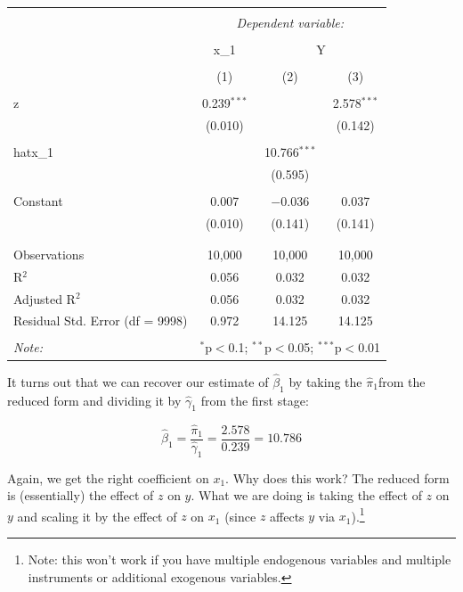 \documentclass[
]{article}
\begin{document}
\begin{table}[!htbp] \centering 
  \caption{} 
  \label{} 
\begin{tabular}{@{\extracolsep{5pt}}lccc} 
\\[-1.8ex]\hline 
\hline \\[-1.8ex] 
 & \multicolumn{3}{c}{\textit{Dependent variable:}} \\ 
\cline{2-4} 
\\[-1.8ex] & x\_1 & \multicolumn{2}{c}{Y} \\ 
\\[-1.8ex] & (1) & (2) & (3)\\ 
\hline \\[-1.8ex] 
 z & 0.239$^{***}$ &  & 2.578$^{***}$ \\ 
  & (0.010) &  & (0.142) \\ 
  & & & \\ 
 hatx\_1 &  & 10.766$^{***}$ &  \\ 
  &  & (0.595) &  \\ 
  & & & \\ 
 Constant & 0.007 & $-$0.036 & 0.037 \\ 
  & (0.010) & (0.141) & (0.141) \\ 
  & & & \\ 
\hline \\[-1.8ex] 
Observations & 10,000 & 10,000 & 10,000 \\ 
R$^{2}$ & 0.056 & 0.032 & 0.032 \\ 
Adjusted R$^{2}$ & 0.056 & 0.032 & 0.032 \\ 
Residual Std. Error (df = 9998) & 0.972 & 14.125 & 14.125 \\ 
\hline 
\hline \\[-1.8ex] 
\textit{Note:}  & \multicolumn{3}{r}{$^{*}$p$<$0.1; $^{**}$p$<$0.05; $^{***}$p$<$0.01} \\ 
\end{tabular} 
\end{table}

It turns out that we can recover our estimate of \(\hat{\beta}_1\) by
taking the \(\hat{\pi}_1\)from the reduced form and dividing it by
\(\hat{\gamma}_1\) from the first stage:

\[
\hat{\beta}_1=\frac{\hat{\pi}_1}{\hat{\gamma}_1}=\frac{2.578}{0.239}=10.786
\]

Again, we get the right coefficient on \(x_1\). Why does this work? The
reduced form is (essentially) the effect of \(z\) on \(y\). What we are
doing is taking the effect of \(z\) on \(y\) and scaling it by the
effect of \(z\) on \(x_1\) (since \(z\) affects \(y\) via
\(x_1\)).\footnote{Note: this won't work if you have multiple endogenous
  variables and multiple instruments or additional exogenous variables.}
\end{document}
